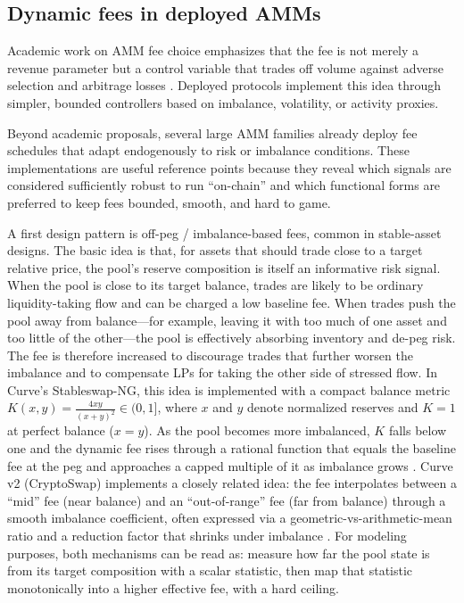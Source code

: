 \documentclass[11pt]{article}
\begin{document}
\subsection{Dynamic fees in deployed AMMs}
\label{subsec:deployed_dynamic_fees}

Academic work on AMM fee choice emphasizes that the fee is not merely a revenue parameter but a control variable that trades off volume against adverse selection and arbitrage losses \cite{milionis2023,CARTEA2025105134}. Deployed protocols implement this idea through simpler, bounded controllers based on imbalance, volatility, or activity proxies.

Beyond academic proposals, several large AMM families already deploy fee schedules that adapt endogenously to risk or imbalance conditions. These implementations are useful reference points because they reveal which signals are considered sufficiently robust to run ``on-chain'' and which functional forms are preferred to keep fees bounded, smooth, and hard to game.

A first design pattern is off-peg / imbalance-based fees, common in stable-asset designs. The basic idea is that, for assets that should trade close to a target relative price, the pool's reserve composition is itself an informative risk signal. When the pool is close to its target balance, trades are likely to be ordinary liquidity-taking flow and can be charged a low baseline fee. When trades push the pool away from balance---for example, leaving it with too much of one asset and too little of the other---the pool is effectively absorbing inventory and de-peg risk. The fee is therefore increased to discourage trades that further worsen the imbalance and to compensate LPs for taking the other side of stressed flow. In Curve's Stableswap-NG, this idea is implemented with a compact balance metric
$K(x,y)=\frac{4xy}{(x+y)^2}\in(0,1]$, where $x$ and $y$ denote normalized reserves and $K=1$ at perfect balance ($x=y$). As the pool becomes more imbalanced, $K$ falls below one and the dynamic fee rises through a rational function that equals the baseline fee at the peg and approaches a capped multiple of it as imbalance grows \cite{curve_stableswap_ng}. Curve v2 (CryptoSwap) implements a closely related idea: the fee interpolates between a ``mid'' fee (near balance) and an ``out-of-range'' fee (far from balance) through a smooth imbalance coefficient, often expressed via a geometric-vs-arithmetic-mean ratio and a reduction factor that shrinks under imbalance \cite{curve_cryptoswap_whitepaper}. For modeling purposes, both mechanisms can be read as: measure how far the pool state is from its target composition with a scalar statistic, then map that statistic monotonically into a higher effective fee, with a hard ceiling.
\end{document}
